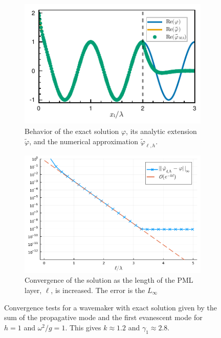 \documentclass[11pt]{article}
\newcommand{\tvarphi}{\tilde \varphi}
\begin{document}
\begin{figure}
  \centering
  \begin{subfigure}{0.49\linewidth}
    \includegraphics[width=1\textwidth]{figures/wavemaker_modal_solution.pdf}
    \caption{Behavior of the exact solution $\varphi$, its analytic extension $\tvarphi$, and the numerical approximation $\tvarphi_{\ell,h}$.}
  \end{subfigure}
  \begin{subfigure}{0.49\linewidth}
    \includegraphics[width=1\textwidth]{figures/convergence_pml_planewave_depth_1.pdf}
    \caption{Convergence of the solution as the length of the PML layer, $\ell$, is increased. The error is the $L_\infty$ }
  \end{subfigure}
  \label{fig:convergence-sourcepoint}
  \caption{Convergence tests for a wavemaker with exact solution given by the sum of the propagative mode and the first evanescent mode for $h=1$ and $\omega^2/g = 1$. This gives $k \approx 1.2$ and $\gamma_1 \approx 2.8$. }
\end{figure}
\end{document}
